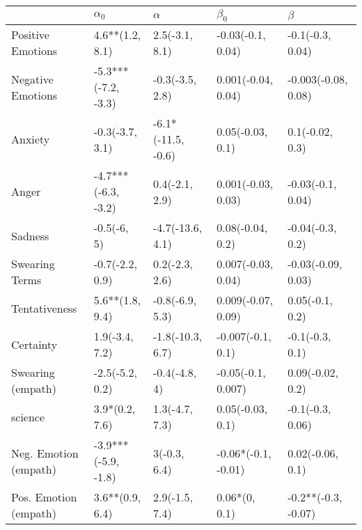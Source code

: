 \begin{tabular}{lllll}
\toprule
{} &           $\alpha_0$ &            $\alpha$ &            $\beta_0$ &              $\beta$ \\
\midrule
Positive Emotions     &      4.6**(1.2, 8.1) &      2.5(-3.1, 8.1) &    -0.03(-0.1, 0.04) &     -0.1(-0.3, 0.04) \\
Negative Emotions     &  -5.3***(-7.2, -3.3) &     -0.3(-3.5, 2.8) &   0.001(-0.04, 0.04) &  -0.003(-0.08, 0.08) \\
Anxiety               &      -0.3(-3.7, 3.1) &  -6.1*(-11.5, -0.6) &     0.05(-0.03, 0.1) &      0.1(-0.02, 0.3) \\
Anger                 &  -4.7***(-6.3, -3.2) &      0.4(-2.1, 2.9) &   0.001(-0.03, 0.03) &    -0.03(-0.1, 0.04) \\
Sadness               &          -0.5(-6, 5) &    -4.7(-13.6, 4.1) &     0.08(-0.04, 0.2) &     -0.04(-0.3, 0.2) \\
Swearing Terms        &      -0.7(-2.2, 0.9) &      0.2(-2.3, 2.6) &   0.007(-0.03, 0.04) &   -0.03(-0.09, 0.03) \\
Tentativeness         &      5.6**(1.8, 9.4) &     -0.8(-6.9, 5.3) &   0.009(-0.07, 0.09) &      0.05(-0.1, 0.2) \\
Certainty             &       1.9(-3.4, 7.2) &    -1.8(-10.3, 6.7) &    -0.007(-0.1, 0.1) &      -0.1(-0.3, 0.1) \\
Swearing (empath)     &      -2.5(-5.2, 0.2) &       -0.4(-4.8, 4) &   -0.05(-0.1, 0.007) &     0.09(-0.02, 0.2) \\
science               &       3.9*(0.2, 7.6) &      1.3(-4.7, 7.3) &     0.05(-0.03, 0.1) &     -0.1(-0.3, 0.06) \\
Neg. Emotion (empath) &  -3.9***(-5.9, -1.8) &        3(-0.3, 6.4) &  -0.06*(-0.1, -0.01) &     0.02(-0.06, 0.1) \\
Pos. Emotion (empath) &      3.6**(0.9, 6.4) &      2.9(-1.5, 7.4) &        0.06*(0, 0.1) &  -0.2**(-0.3, -0.07) \\
\bottomrule
\end{tabular}
